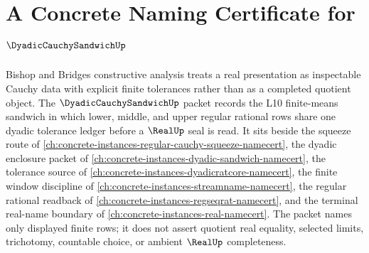 \chapter{A Concrete Naming Certificate for $\DyadicCauchySandwichUp$}
\label{ch:concrete-instances-dyadic-cauchy-sandwich-namecert}

Bishop and Bridges constructive analysis treats a real presentation as inspectable Cauchy data with explicit finite tolerances rather than as a completed quotient object. The $\DyadicCauchySandwichUp$ packet records the L10 finite-means sandwich in which lower, middle, and upper regular rational rows share one dyadic tolerance ledger before a $\RealUp$ seal is read. It sits beside the squeeze route of \autoref{ch:concrete-instances-regular-cauchy-squeeze-namecert}, the dyadic enclosure packet of \autoref{ch:concrete-instances-dyadic-sandwich-namecert}, the tolerance source of \autoref{ch:concrete-instances-dyadicratcore-namecert}, the finite window discipline of \autoref{ch:concrete-instances-streamname-namecert}, the regular rational readback of \autoref{ch:concrete-instances-regseqrat-namecert}, and the terminal real-name boundary of \autoref{ch:concrete-instances-real-namecert}. The packet names only displayed finite rows; it does not assert quotient real equality, selected limits, trichotomy, countable choice, or ambient $\RealUp$ completeness.

